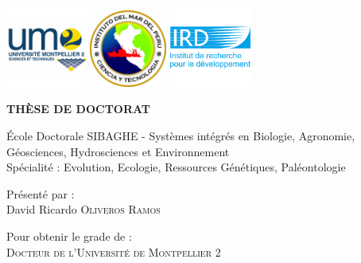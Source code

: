 
\begin{titlepage}
\begin{center}
  
\vspace*{-0.08\textheight}

\includegraphics[width=0.2\textwidth]{figures/um2.png}\hfill
\includegraphics[width=0.19\textwidth]{figures/imarpe.png}\hfill
\includegraphics[width=0.2\textwidth]{figures/ird.png}

\vspace*{.03\textheight}
\begin{center}
{\LARGE \textbf{TH\`{E}SE DE DOCTORAT}}\\
\end{center}

\vspace*{.005\textheight}
\begin{center}
{\large \'{E}cole Doctorale SIBAGHE - Syst\`{e}mes int\'{e}gr\'{e}s en Biologie, Agronomie, G\'{e}osciences, 
Hydrosciences et Environnement}\\[.01\textheight]
{Sp\'{e}cialit\'{e} : Evolution, Ecologie, Ressources G\'{e}n\'{e}tiques, Pal\'{e}ontologie}

\end{center}

\vspace*{.005\textheight}
\begin{center}
{\large Pr\'{e}sent\'{e} par :\\ David Ricardo \textsc{Oliveros Ramos}}
\end{center}

\vspace*{.005\textheight}
\begin{center}
{\large Pour obtenir le grade de :\\ \textsc{Docteur de l'Universit\'{e} de Montpellier 2}}
\end{center}


\end{center}
\end{titlepage}
